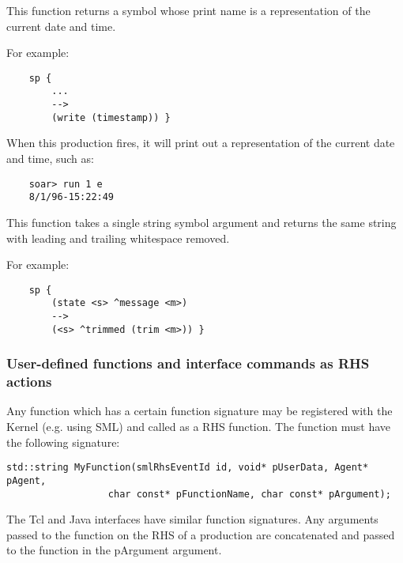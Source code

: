 \begin{description}
\item [\soarb{timestamp} --- ] 
	This function returns a symbol whose print name is a representation of the current date and time. 

	For example:
	
	\begin{verbatim}
	sp {
	    ...
	    -->
	    (write (timestamp)) }
	\end{verbatim}
	
	When this production fires, it will print out a representation of the current date and time, such as:
	
	\begin{verbatim}
	soar> run 1 e
	8/1/96-15:22:49
	\end{verbatim}


\item [\soarb{trim} --- ] 
	This function takes a single string symbol argument and returns the same string with leading and trailing whitespace removed.

	For example:
	
	\begin{verbatim}
	sp {
	    (state <s> ^message <m>)
	    -->
	    (<s> ^trimmed (trim <m>)) }
	\end{verbatim}

\end{description}

\subdivider
\subsubsection*{User-defined functions and interface commands as RHS actions}

Any function which has a certain function signature may be registered with the Kernel (e.g. using SML) and called as a RHS function.  The function must have the following signature:

\begin{verbatim}
std::string MyFunction(smlRhsEventId id, void* pUserData, Agent* pAgent,
                  char const* pFunctionName, char const* pArgument);
\end{verbatim}

The Tcl and Java interfaces have similar function signatures. Any arguments passed to the function on the RHS of a production are concatenated and passed to the function in the pArgument argument.


